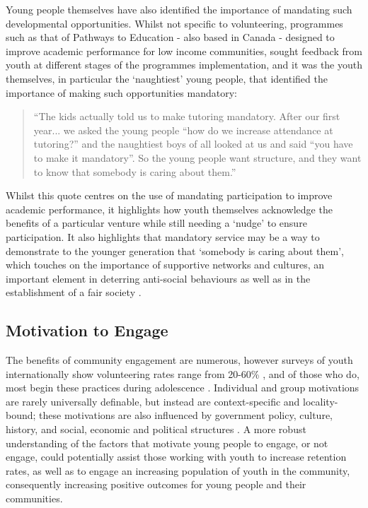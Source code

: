 Young people themselves have also identified the importance of mandating such developmental opportunities. Whilst not specific to volunteering, programmes such as that of Pathways to Education - also based in Canada - designed to improve academic performance for low income communities, sought feedback from youth at different stages of the programmes implementation, and it was the youth themselves, in particular the ‘naughtiest’ young people, that identified the importance of making such opportunities mandatory:
\begin{quote}
	“The kids actually told us to make tutoring mandatory. After our first year... we asked the young people “how do we increase attendance at tutoring?” and the naughtiest boys of all looked at us and said “you have to make it mandatory”. So the young people want structure, and they want to know that somebody is caring about them.”
	 \citep[Caroline Acker as quoted in][]{Dubner2014}
\end{quote}
Whilst this quote centres on the use of mandating participation to improve academic performance, it highlights how youth themselves acknowledge the benefits of a particular venture while still needing a ‘nudge’ to ensure participation. It also highlights that mandatory service may be a way to demonstrate to the younger generation that ‘somebody is caring about them', which touches on the importance of supportive networks and cultures, an important element in deterring anti-social behaviours \citep{Kerestes2004} as well as in the establishment of a fair society \citep{Marmot2010}. %



\subsection{Motivation to Engage} %
\label{Motivation}
The benefits of community engagement are numerous, however surveys of youth internationally show volunteering rates range from 20-60\% \citep{Flanagan1999}, and of those who do, most begin these practices during adolescence \citep{Hart2007, Youniss1999a, Metz2003, Zaff2008}. Individual and group motivations are rarely universally definable, but instead are context-specific and locality-bound; these motivations are also influenced by government policy, culture, history, and social, economic and political structures \citep{Botes2000}. A more robust understanding of the factors that motivate young people to engage, or not engage, could potentially assist those working with youth to increase retention rates, as well as to engage an increasing population of youth in the community, consequently increasing positive outcomes for young people and their communities. 

